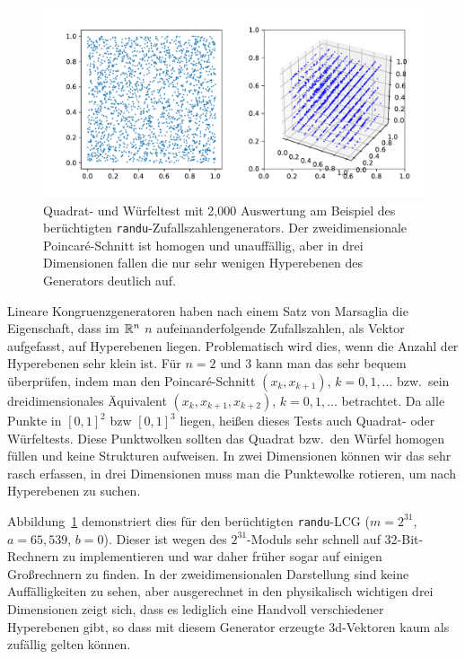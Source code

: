 \begin{figure}
  \centering
  \includegraphics[width=\textwidth]{plots/optical_test}
  \caption{Quadrat- und Würfeltest mit 2,000 Auswertung am Beispiel
    des berüchtigten \texttt{randu}-Zufallszahlengenerators. Der
    zweidimensionale Poincar\'e-Schnitt ist homogen und unauffällig,
    aber in drei Dimensionen fallen die nur sehr wenigen Hyperebenen
    des Generators deutlich auf.}
  \label{fig:optical_test}
\end{figure}

Lineare Kongruenzgeneratoren haben nach einem Satz von Marsaglia die
Eigenschaft, dass im $\mathbb{R}^n$ $n$ aufeinanderfolgende Zufallszahlen,
als Vektor aufgefasst, auf Hyperebenen liegen. Problematisch wird
dies, wenn die Anzahl der Hyperebenen sehr klein ist. Für $n=2$ und
$3$ kann man das sehr bequem überprüfen, indem man den
Poincar\'e-Schnitt $(x_k, x_{k+1})$, $k=0,1,\ldots$ bzw.\ sein
dreidimensionales Äquivalent $(x_k, x_{k+1}, x_{k+2})$, $k=0,1,\ldots$
betrachtet. Da alle Punkte in $[0,1]^2$ bzw $[0,1]^3$ liegen, heißen
dieses Tests auch Quadrat- oder Würfeltests. Diese Punktwolken sollten
das Quadrat bzw.\ den Würfel homogen füllen und keine Strukturen
aufweisen. In zwei Dimensionen können wir das sehr rasch erfassen, in
drei Dimensionen muss man die Punktewolke rotieren, um nach
Hyperebenen zu suchen.

Abbildung~\ref{fig:optical_test} demonstriert dies für den
berüchtigten \texttt{randu}-LCG ($m=2^{31}$, $a=65,539$,
$b=0$). Dieser ist wegen des $2^{31}$-Moduls sehr schnell auf
32-Bit-Rechnern zu implementieren und war daher früher sogar auf
einigen Großrechnern zu finden. In der zweidimensionalen Darstellung
sind keine Auffälligkeiten zu sehen, aber ausgerechnet in den
physikalisch wichtigen drei Dimensionen zeigt sich, dass es lediglich
eine Handvoll verschiedener Hyperebenen gibt, so dass mit diesem
Generator erzeugte 3d-Vektoren kaum als zufällig gelten können.

